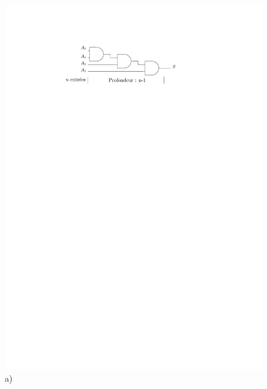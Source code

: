 \begin{figure}[htbp]
   \begin{minipage}[c]{.46\linewidth}
\includegraphics[width=\columnwidth]{Figs/and_4e_cascade.pdf} \\\centering a)
   \end{minipage} \hfill
   \begin{minipage}[c]{.36\linewidth}

\end{minipage}
\end{figure}
